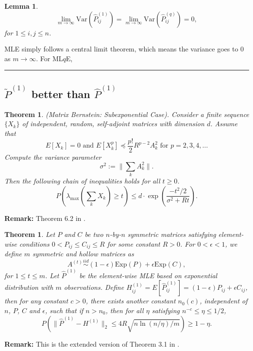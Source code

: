 \documentclass[a4paper]{article}
\newenvironment{proof}{{\bf Proof:  }}{\hfill\rule{2mm}{2mm}}
\newtheorem{lemma}[fact]{Lemma}
\newtheorem{theorem}[fact]{Theorem}
\begin{document}
\begin{lemma}%
\[
	\lim_{m \to \infty} \mathrm{Var}(\hat{P}^{(1)}_{ij})
    = \lim_{m \to \infty} \mathrm{Var}(\hat{P}^{(q)}_{ij}) = 0,
\]
for $1 \le i, j \le n$.
\end{lemma}
\begin{proof}
MLE simply follows a central limit theorem, which means the variance goes to 0 as $m \to \infty$.
For ML$q$E, 
\end{proof}










\subsection{$\widetilde{P}^{(1)}$ better than $\hat{P}^{(1)}$}


\begin{theorem}
\label{thm:BernsteinMatrix}
(Matrix Bernstein: Subexponential Case). Consider a finite sequence $\{X_k\}$ of
independent, random, self-adjoint matrices with dimension $d$. Assume that
\[
	E[X_k] = 0 \text{\ \ \ and \ \ \ }  E[X_k^p] \preceq \frac{p!}{2} R^{p-2} A_k^2 \text{\ \ for } p = 2,3,4, \dots
\]
Compute the variance parameter
\[
	\sigma^2 := \|\sum_k A_k^2\|.
\]
Then the following chain of inequalities holds for all $t \ge 0$.
\[
	P \left( \lambda_{\max} \left( \sum_k X_k \right) \ge t \right) \le d \cdot \exp \left( \frac{-t^2/2}{\sigma^2 + R t} \right).
\]
\end{theorem}
\textbf{Remark:} Theorem 6.2 in \cite{tropp2012user}.








\begin{theorem}%
\label{thm:P1Diff}
Let $P$ and $C$ be two $n$-by-$n$ symmetric matrices satisfying element-wise conditions $0 < P_{ij} \le C_{ij} \le R$ for some constant $R > 0$. For $0 < \epsilon < 1$, we define $m$ symmetric and hollow matrices as
\[
	A^{(t)} \stackrel{iid}{\sim} (1-\epsilon) \mathrm{Exp}(P) + \epsilon \mathrm{Exp}(C),
\]
for $1 \le t \le m$.
Let $\hat{P}^{(1)}$ be the element-wise MLE based on exponential distribution with $m$ observations.
Define $H_{ij}^{(1)} = E[\hat{P}_{ij}^{(1)}] = (1-\epsilon) P_{ij} + \epsilon C_{ij}$,
then for any constant $c > 0$, there exists another constant $n_0(c)$, independent of $n$, $P$, $C$ and $\epsilon$, such that if $n > n_0$, then for all $\eta$ satisfying $n^{-c} \le \eta \le 1/2$,
\[
	P \left( \| \hat{P}^{(1)} - H^{(1)} \|_2 \le 4 R \sqrt{n \ln(n/\eta)/m}\right) \ge 1 - \eta.
\]
\end{theorem}
\textbf{Remark:} This is the extended version of Theorem 3.1 in \cite{oliveira2009concentration}.
\end{document}
